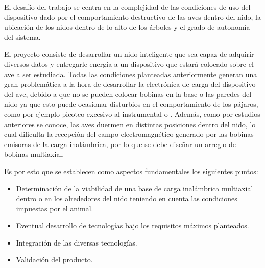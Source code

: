 El desafío del trabajo se centra en la complejidad de las condiciones de uso del dispositivo dado por el comportamiento destructivo de las aves dentro del nido, la ubicación de los nidos dentro de lo alto de los árboles y el grado de autonomía del sistema. 

El proyecto consiste de desarrollar un nido inteligente que sea capaz de adquirir diversos datos y entregarle energía a un dispositivo que estará colocado sobre el ave a ser estudiada. Todas las condiciones planteadas anteriormente generan una gran problemática a la hora de desarrollar la electrónica de carga del dispositivo del ave, debido a que no se pueden colocar bobinas en la base o las paredes del nido ya que esto puede ocasionar disturbios en el comportamiento de los pájaros, como por ejemplo picoteo excesivo al instrumental o . Además, como por estudios anteriores se conoce, las aves duermen en distintas posiciones dentro del nido, lo cual dificulta la recepción del campo electromagnético generado por las bobinas emisoras de la carga inalámbrica, por lo que se debe diseñar un arreglo de bobinas multiaxial.


Es por esto que se establecen como aspectos fundamentales los siguientes puntos:
\begin{itemize}
	\item Determinación de la viabilidad de una base de carga inalámbrica multiaxial dentro o en los alrededores del nido teniendo en cuenta las condiciones impuestas por el animal.
	\item Eventual desarrollo de tecnologías bajo los requisitos máximos planteados.
	\item Integración de las diversas tecnologías.
	\item Validación del producto.
\end{itemize}

